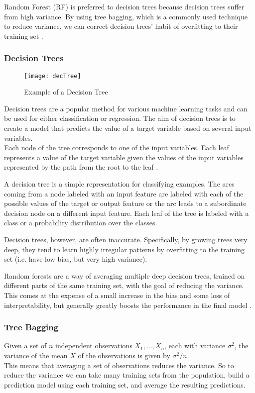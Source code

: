 Random Forest (RF) is preferred to decision trees because decision trees suffer from high variance. By using tree bagging, which is a commonly used technique to reduce variance, we can correct decision trees' habit of overfitting to their training set \cite{ESL}.

\subsubsection{Decision Trees}
\begin{figure}[H]
	\centering
	\texttt{[image: decTree]}
	\caption{Example of a Decision Tree \cite{KDNrf}}
	\label{fig:decTree}
\end{figure}

Decision trees are a popular method for various machine learning tasks and can be used for either classification or regression. The aim of decision trees is to create a model that predicts the value of a target variable based on several input variables. \\
Each node of the tree corresponds to one of the input variables. Each leaf represents a value of the target variable given the values of the input variables represented by the path from the root to the leaf \cite{wiki:DT}.

A decision tree is a simple representation for classifying examples. The arcs coming from a node labeled with an input feature are labeled with each of the possible values of the target or output feature or the arc leads to a subordinate decision node on a different input feature. Each leaf of the tree is labeled with a class or a probability distribution over the classes.

Decision trees, however, are often inaccurate. Specifically, by growing trees very deep, they tend to learn highly irregular patterns by overfitting to the training set (i.e. have low bias, but very high variance). 

Random forests are a way of averaging multiple deep decision trees, trained on different parts of the same training set, with the goal of reducing the variance. \\
This comes at the expense of a small increase in the bias and some loss of interpretability, but generally greatly boosts the performance in the final model \cite{ESL}. 

\subsubsection{Tree Bagging}
Given a set of $n$ independent observations $X_1, \dots, X_n$, each with variance $\sigma^2$, the variance of the mean $\overline{X}$ of the observations is given by $\sigma^2/n$. \\
This means that averaging a set of observations reduces the variance. So to reduce the variance we can take many training sets from the population, build a prediction model using each training set, and average the resulting predictions. 

